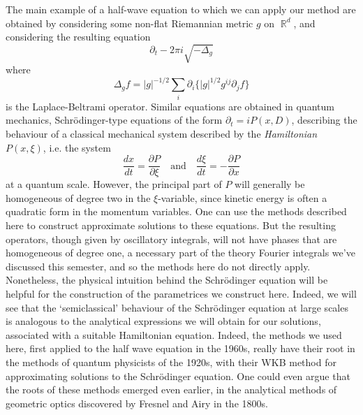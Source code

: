 \documentclass{article}
\theoremstyle{plain}
\theoremstyle{remark}
\theoremstyle{definition}
\DeclareMathOperator{\RR}{\mathbb{R}}
\begin{document}

The main example of a half-wave equation to which we can apply our method are obtained by considering some non-flat Riemannian metric $g$ on $\RR^d$, and considering the resulting equation
%
\[ \partial_t - 2 \pi i \sqrt{-\Delta_g} \]
%
where
%
\[ \Delta_g f = |g|^{-1/2} \sum_i \partial_i \{ |g|^{1/2} g^{ij} \partial_j f \} \]
%
is the Laplace-Beltrami operator. Similar equations are obtained in quantum mechanics, Schr\"{o}dinger-type equations of the form $\partial_t = i P(x,D)$, describing the behaviour of a classical mechanical system described by the \emph{Hamiltonian} $P(x,\xi)$, i.e. the system
%
\[ \frac{dx}{dt} = \frac{\partial P}{\partial \xi} \quad\text{and}\quad \frac{d\xi}{dt} = - \frac{\partial P}{\partial x} \]
%
at a quantum scale. However, the principal part of $P$ will generally be homogeneous of degree two in the $\xi$-variable, since kinetic energy is often a quadratic form in the momentum variables. One can use the methods described here to construct approximate solutions to these equations. But the resulting operators, though given by oscillatory integrals, will not have phases that are homogeneous of degree one, a necessary part of the theory Fourier integrals we've discussed this semester, and so the methods here do not directly apply. Nonetheless, the physical intuition behind the Schr\"{o}dinger equation will be helpful for the construction of the parametrices we construct here. Indeed, we will see that the `semiclassical' behaviour of the Schr\"{o}dinger equation at large scales is analogous to the analytical expressions we will obtain for our solutions, associated with a suitable Hamiltonian equation. Indeed, the methods we used here, first applied to the half wave equation in the 1960s, really have their root in the methods of quantum physicists of the 1920s, with their WKB method for approximating solutions to the Schr\"{o}dinger equation. One could even argue that the roots of these methods emerged even earlier, in the analytical methods of geometric optics discovered by Fresnel and Airy in the 1800s.
\end{document}

